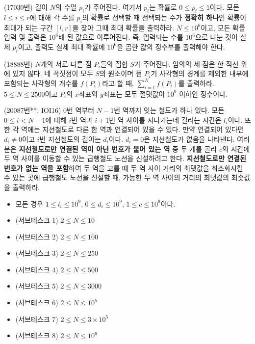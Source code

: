 \begin{problem} 
    (17030번) 길이 $N$의 수열 $p_i$가 주어진다. 여기서 $p_i$는 확률로 $0 \leq p_i \leq 1$이다. 모든 $l \leq i \leq r$에 대해 각 수를 $p_i$의 확률로 선택할 때 선택되는 수가 \textbf{정확히 하나}인 확률이 최대가 되는 구간 $[l, r]$을 찾아 그때 최대 확률을 출력하라. $N \leq 10^6$이고, 모든 확률 입력 및 출력은 $10^6$배 된 값으로 이루어진다. 즉, 입력되는 수를 $10^6$으로 나눈 것이 실제 $p_i$이고, 출력도 실제 최대 확률에 $10^6$을 곱한 값의 정수부를 출력해야 한다.
\end{problem}

\begin{problem}
    (18888번) $N$개의 서로 다른 점 $P_i$들의 집합 $S$가 주어진다. 임의의 세 점은 한 직선 위에 있지 않다. 네 꼭짓점이 모두 $S$의 원소이며 점 $P_i$기 사각형의 경계를 제외한 내부에 포함되는 사각형의 개수를 $f(P_i)$라고 할 때, $\sum_{i=1}^N {f(P_i)}$를 출력하라. $5 \leq N \leq 2500$이고 $P_i$의 $x$좌표와 $y$좌표는 모두 절댓값이 $10^9$ 이하인 정수이다.
\end{problem}

\begin{problem}
    (20087번**, IOI16) $0$번 역부터 $N-1$번 역까지 잇는 철도가 하나 있다. 모든 $0 \leq i < N-1$에 대해 $i$번 역과 $i+1$번 역 사이를 지나가는데 걸리는 시간은 $l_i$이다. 또한 각 역에는 지선철도로 다른 한 역과 연결되어 있을 수 있다. 만약 연결되어 있다면 $d_i \neq 0$이고 $i$번 지선철도의 길이는 $d_i$이다. $d_i = 0$은 지선철도가 없음을 나타낸다. 여러분은 \textbf{지선철도로만 연결된 역이 아닌 번호가 붙어 있는 역} 중 두 개를 골라 $c$의 시간에 두 역 사이를 이동할 수 있는 급행철도 노선을 신설하려고 한다. \textbf{지선철도로만 연결된 번호가 없는 역을 포함}하여 두 역을 고를 떄 두 역 사이 거리의 최댓값을 최소화시킬 수 있는 곳에 급행철도 노선을 신설할 때, 가능한 두 역 사이의 거리의 최댓값의 최솟값을 출력하라.
    \begin{itemize}
        \item 모든 경우 $1 \leq l_i \leq 10^9$, $0 \leq d_i \leq 10^9$, $1 \leq c \leq 10^9$이다.
        \item (서브테스크 1) $2 \leq N \leq 10$
        \item (서브테스크 2) $2 \leq N \leq 100$
        \item (서브테스크 3) $2 \leq N \leq 250$
        \item (서브테스크 4) $2 \leq N \leq 500$
        \item (서브테스크 5) $2 \leq N \leq 3000$
        \item (서브테스크 6) $2 \leq N \leq 10^5$
        \item (서브테스크 7) $2 \leq N \leq 3 \times 10^5$
        \item (서브테스크 8) $2 \leq N \leq 10^6$
    \end{itemize}
\end{problem}

